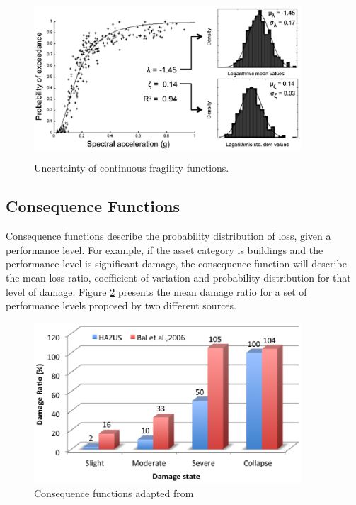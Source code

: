 \begin{figure}[ht]
\centering
\includegraphics[width=10cm,height=6cm]{./Figures/Part_Risk/FF_uncertainty.eps}
\caption{Uncertainty of continuous fragility functions.}
\label{fig:FFcontinuous}
\end{figure}


\subsection{Consequence Functions}
Consequence functions describe the probability distribution of loss, given a performance level. For example, if the asset category is buildings and the performance level is significant damage, the consequence function will describe the mean loss ratio, coefficient of variation and probability distribution for that level of damage. Figure \ref{fig:ConsequenceFunctions} presents the mean damage ratio for a set of performance levels proposed by two different sources. 

\begin{figure}[ht]
\centering
\includegraphics[width=10cm,height=6cm]{./Figures/Part_Risk/ConsequenceFunction.eps}
\caption{Consequence functions adapted from  \citet{Baletal2010}}
\label{fig:ConsequenceFunctions}
\end{figure}

